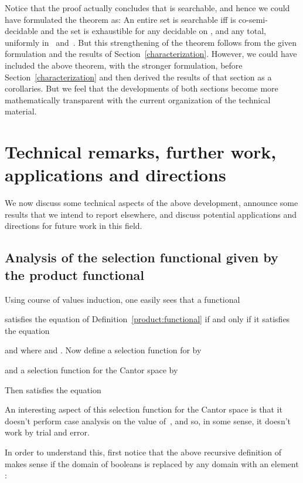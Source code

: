 \documentclass{LMCS}
\newcommand{\licsmath}[1]{}
\newcommand{\pBool}{\mathcal{B}}
\newcommand{\D}{D}
\begin{document}
Notice that the proof actually concludes that  is searchable, and
hence we could have formulated the theorem as: An entire set  is searchable iff  is co-semi-decidable and
the set  is exhaustible for any  decidable on ,
and any  total, uniformly in~ and~.  But this
strengthening of the theorem follows from the given formulation and
the results of Section~\ref{characterization}. However, we could have
included the above theorem, with the stronger formulation, before
Section~\ref{characterization} and then derived the results of that
section as a corollaries. But we feel that the developments of both
sections become more mathematically transparent with the current
organization of the technical material.

\section{Technical remarks, further work, applications and directions} \label{technical}

We now discuss some technical aspects of the above development,
announce some results that we intend to report elsewhere, and discuss
potential applications and directions for future work in this field.

\subsection{Analysis of the selection functional given by the product functional}

\newcommand{\eval}{\operatorname{eval}}

Using course of values induction, one easily sees that a functional
\licsmath{\Pi \colon ((\D \to
  \pBool) \to \D)^\omega \to ((\D^\omega \to \pBool) \to \D^\omega)}
satisfies the equation of Definition~\ref{product:functional} if and
only if it satisfies the equation

and where  and .  Now
define a selection function  for  by

and a selection function  for the Cantor space  by

Then  satisfies the equation

An interesting aspect of this selection function for the Cantor space
is that it doesn't perform case analysis on the value of~, and so,
in some sense, it doesn't work by trial and error.

In order to understand this, first notice that the above recursive
definition of  makes sense if the domain of booleans is replaced
by any domain  with an element :
\end{document}
